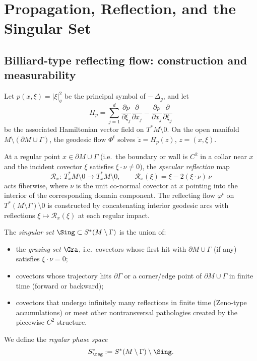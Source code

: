 
\section{Propagation, Reflection, and the Singular Set}
\label{sec:propagation}

\subsection{Billiard-type reflecting flow: construction and measurability}
Let $p(x,\xi)=|\xi|_g^2$ be the principal symbol of $-\,\Delta_g$, and let
\[
H_p = \sum_{j=1}^d \frac{\partial p}{\partial \xi_j}\frac{\partial}{\partial x_j}
   - \frac{\partial p}{\partial x_j}\frac{\partial}{\partial \xi_j}
\]
be the associated Hamiltonian vector field on $T^*M\setminus 0$. On the open manifold $M\setminus (\partial M\cup\Gamma)$, the geodesic flow $\Phi^t$ solves $\dot z = H_p(z)$, $z=(x,\xi)$.

At a regular point $x\in\partial M\cup\Gamma$ (i.e.\ the boundary or wall is $C^2$ in a collar near $x$ and the incident covector $\xi$ satisfies $\xi\cdot \nu\neq 0$), the \emph{specular reflection} map
\[
\mathcal R_x:\ T_x^*M\setminus 0 \to T_x^*M\setminus 0, 
\qquad \mathcal R_x(\xi)=\xi-2(\xi\cdot \nu)\,\nu
\]
acts fiberwise, where $\nu$ is the unit co-normal covector at $x$ pointing into the interior of the corresponding domain component. The reflecting flow $\varphi^t$ on $T^*(M\setminus\Gamma)\setminus 0$ is constructed by concatenating interior geodesic arcs with reflections $\xi\mapsto \mathcal R_x(\xi)$ at each regular impact.

\begin{definition}
\label{def:regular-singular}
The \emph{singular set} $\Sing\subset S^*(M\setminus\Gamma)$ is the union of:
\begin{itemize}
  \item the \emph{grazing set} $\Gra$, i.e.\ covectors whose first hit with $\partial M\cup\Gamma$ (if any) satisfies $\xi\cdot \nu=0$;
  \item covectors whose trajectory hits $\partial\Gamma$ or a corner/edge point of $\partial M\cup\Gamma$ in finite time (forward or backward);
  \item covectors that undergo infinitely many reflections in finite time (Zeno-type accumulations) or meet other nontransversal pathologies created by the piecewise $C^2$ structure.
\end{itemize}
We define the \emph{regular phase space}
\[
S^*_{\reg}:=S^*(M\setminus\Gamma)\setminus \Sing.
\]
\end{definition}

